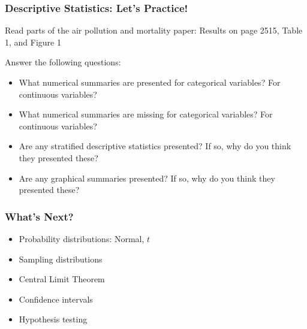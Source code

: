 \documentclass[12pt, 
hyperref={colorlinks=true, linkcolor=blue, urlcolor=cyan}]{beamer}
\begin{document}
\begin{frame}
\frametitle{Descriptive Statistics: Let's Practice!}

Read parts of the air pollution and mortality paper: Results on page 2515, Table 1, and Figure 1

Answer the following questions:
\begin{itemize}
\item What numerical summaries are presented for categorical variables? For continuous variables?
\item What numerical summaries are missing for categorical variables? For continuous variables?
\item Are any stratified descriptive statistics presented? If so, why do you think they presented these?
\item Are any graphical summaries presented? If so, why do you think they presented these?
\end{itemize}
\end{frame}

\begin{frame}
\frametitle{What's Next?}
\begin{itemize}
\item Probability distributions: Normal, $t$
\item Sampling distributions
\item Central Limit Theorem
\item Confidence intervals
\item Hypothesis testing
\end{itemize}
\end{frame}
\end{document}
